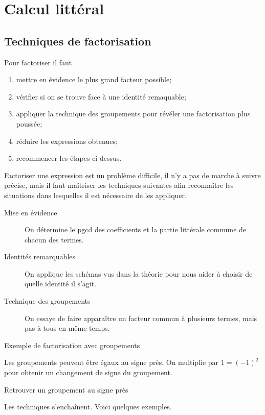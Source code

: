 \documentclass[a4paper,12pt]{article}
\begin{document}
\tableofcontents

\newpage
\section{Calcul littéral}

\subsection{Techniques de factorisation}

 Pour factoriser il faut 
  \begin{enumerate}
	  \item mettre en évidence le plus grand facteur possible;
	  \item vérifier si on se trouve face à une identité remaquable;
	  \item appliquer la technique des groupements pour révéler une factorisation plus poussée;
	\item réduire les expressions obtenues;
	\item recommencer les étapes ci-dessus.
\end{enumerate}
Factoriser une expression est un problème difficile, il n'y a pas de marche à suivre précise, mais il faut maîtriser les techniques suivantes afin reconnaître les situations dans lesquelles il est nécessaire de les appliquer.
\begin{description}
\item[Mise en évidence] On détermine le pgcd des coefficients et la partie littérale commune de chacun des termes.
\item[Identités remarquables] On applique les schémas vus dans la théorie pour nous aider à choisir de quelle identité il s'agit.
\item[Technique des groupements] On essaye de faire apparaître un facteur commun à plusieurs termes, mais pas à tous en même temps.
\end{description}

\begin{exemple}
	Exemple de factorisation avec groupements
	\tcblower
\vspace{5cm}

\end{exemple}
Les groupements peuvent être égaux au signe près. On multiplie par $1=(-1)^2$ pour obtenir un changement de signe du groupement.
\begin{exemple}
	Retrouver un groupement au signe près
	\tcblower
\vspace{6cm}

\end{exemple}
Les techniques s'enchaînent. Voici quelques exemples.
\end{document}
